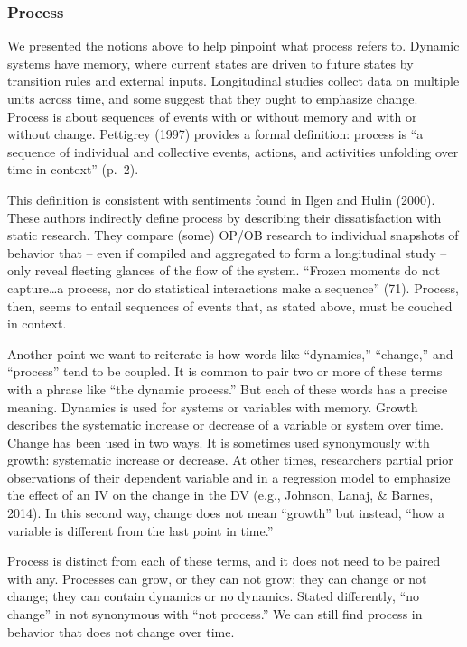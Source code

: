 \documentclass[english,,man]{apa6}
\theoremstyle{definition}
\theoremstyle{definition}
\theoremstyle{definition}
\theoremstyle{remark}
\begin{document}
\hypertarget{process-1}{%
\subsubsection{Process}\label{process-1}}

We presented the notions above to help pinpoint what process refers to.
Dynamic systems have memory, where current states are driven to future
states by transition rules and external inputs. Longitudinal studies
collect data on multiple units across time, and some suggest that they
ought to emphasize change. Process is about sequences of events with or
without memory and with or without change. Pettigrey (1997) provides a
formal definition: process is \enquote{a sequence of individual and
collective events, actions, and activities unfolding over time in
context} (p.~2).

This definition is consistent with sentiments found in Ilgen and Hulin
(2000). These authors indirectly define process by describing their
dissatisfaction with static research. They compare (some) OP/OB research
to individual snapshots of behavior that -- even if compiled and
aggregated to form a longitudinal study -- only reveal fleeting glances
of the flow of the system. \enquote{Frozen moments do not
capture\ldots{}a process, nor do statistical interactions make a
sequence} (71). Process, then, seems to entail sequences of events that,
as stated above, must be couched in context.

Another point we want to reiterate is how words like \enquote{dynamics,}
\enquote{change,} and \enquote{process} tend to be coupled. It is common
to pair two or more of these terms with a phrase like \enquote{the
dynamic process.} But each of these words has a precise meaning.
Dynamics is used for systems or variables with memory. Growth describes
the systematic increase or decrease of a variable or system over time.
Change has been used in two ways. It is sometimes used synonymously with
growth: systematic increase or decrease. At other times, researchers
partial prior observations of their dependent variable and in a
regression model to emphasize the effect of an IV on the change in the
DV (e.g., Johnson, Lanaj, \& Barnes, 2014). In this second way, change
does not mean \enquote{growth} but instead, \enquote{how a variable is
different from the last point in time.}

Process is distinct from each of these terms, and it does not need to be
paired with any. Processes can grow, or they can not grow; they can
change or not change; they can contain dynamics or no dynamics. Stated
differently, \enquote{no change} in not synonymous with \enquote{not
process.} We can still find process in behavior that does not change
over time.
\end{document}
